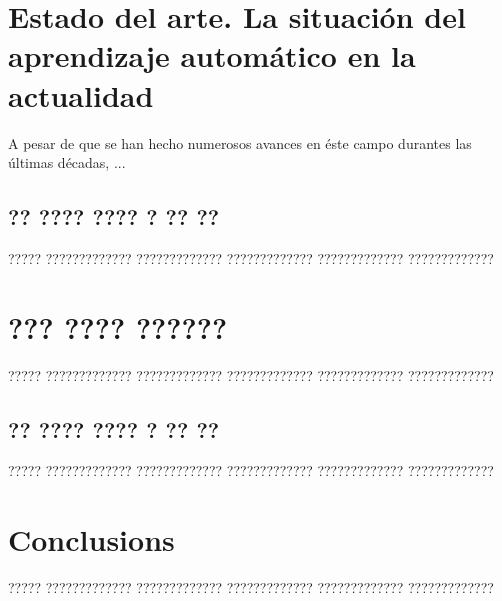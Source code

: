 \documentclass[11pt,spanish,listoffigures,listoftables]{tfgetsinf}
\begin{document}
\chapter{Estado del arte. La situación del aprendizaje automático en la actualidad}

A pesar de que se han hecho numerosos avances en éste campo durantes las últimas décadas, ...

\section{?? ???? ???? ? ?? ??}

????? ????????????? ????????????? ????????????? ????????????? ?????????????

\chapter{??? ???? ??????}

????? ????????????? ????????????? ????????????? ????????????? ????????????? 

\section{?? ???? ???? ? ?? ??}

????? ????????????? ????????????? ????????????? ????????????? ?????????????


\chapter{Conclusions}

????? ????????????? ????????????? ????????????? ????????????? ????????????? 

\end{document}
